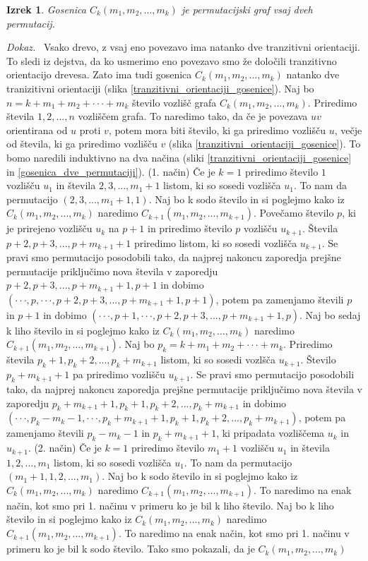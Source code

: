 \documentclass[a4paper, 12pt]{book}
\newtheorem{izrek}{Izrek}[chapter]
\newenvironment{dokaz}{\emph{Dokaz.}\ }{\hspace{\fill}{$\Box$}}
\begin{document}
\begin{izrek}
\label{izrek_gosenica_vsaj_dve_permutaciji}
    Gosenica $C_k(m_1, m_2, ..., m_k)$ je permutacijski graf vsaj dveh permutacij.
\end{izrek}
\begin{dokaz}
    Vsako drevo, z vsaj eno povezavo ima natanko dve tranzitivni orientaciji. To sledi iz dejstva, da ko usmerimo eno povezavo smo že določili tranzitivno orientacijo drevesa. Zato ima tudi gosenica $C_k(m_1, m_2, ..., m_k)$ natanko dve tranizitivni orientaciji (slika \ref{tranzitivni_orientaciji_gosenice}).
    Naj bo $n = k + m_1 + m_2 + \cdot\cdot\cdot + m_k$ število vozlišč grafa $C_k(m_1, m_2, ..., m_k)$. Priredimo števila $1, 2, ..., n$ vozliščem grafa. To naredimo tako, da če je povezava $uv$ orientirana od $u$ proti $v$, potem mora biti število, ki ga priredimo vozlišču $u$, večje od števila, ki ga priredimo vozlišču $v$ (slika \ref{tranzitivni_orientaciji_gosenice}). To bomo naredili induktivno na dva načina (sliki \ref{tranzitivni_orientaciji_gosenice} in \ref{gosenica_dve_permutaciji}). (1. način) Če je $k = 1$ priredimo število $1$ vozlišču $u_1$ in števila $2, 3, ..., m_1+1$ listom, ki so sosedi vozlišča $u_1$. To nam da permutacijo $(2, 3, ..., m_1+1, 1)$. Naj bo k sodo število in si poglejmo kako iz $C_k(m_1, m_2, ..., m_k)$ naredimo $C_{k+1}(m_1, m_2, ..., m_{k+1})$. Povečamo število $p$, ki je prirejeno vozlišču $u_k$ na $p+1$ in priredimo število $p$ vozlišču $u_{k+1}$. Števila $p+2, p+3, ..., p+m_{k+1}+1$ priredimo listom, ki so sosedi vozlišča $u_{k+1}$. Se pravi smo permutacijo posodobili tako, da najprej nakoncu zaporedja prejšne permutacije priključimo nova števila v zaporedju $p+2, p+3, ..., p+m_{k+1}+1, p+1$ in dobimo $(\cdot\cdot\cdot, p, \cdot\cdot\cdot, p+2, p+3, ..., p+m_{k+1}+1, p+1)$, potem pa zamenjamo števili $p$ in $p+1$ in dobimo $(\cdot\cdot\cdot, p+1, \cdot\cdot\cdot, p+2, p+3, ..., p+m_{k+1}+1, p)$. Naj bo sedaj k liho število in si poglejmo kako iz $C_k(m_1, m_2, ..., m_k)$ naredimo $C_{k+1}(m_1, m_2, ..., m_{k+1})$. Naj bo $p_k = k + m_1 + m_2 + \cdot\cdot\cdot + m_k$. Priredimo števila $p_k+1, p_k+2, ..., p_k+m_{k+1}$ listom, ki so sosedi vozlšča $u_{k+1}$. Število $p_k+m_{k+1}+1$ pa priredimo vozlišču $u_{k+1}$. Se pravi smo permutacijo posodobili tako, da najprej nakoncu zaporedja prejšne permutacije priključimo nova števila v zaporedju $p_k + m_{k+1} + 1, p_k+1, p_k+2,...,p_k+m_{k+1}$ in dobimo $(\cdot\cdot\cdot, p_k - m_k - 1, \cdot\cdot\cdot, p_k + m_{k+1} + 1, p_k+1, p_k+2,...,p_k+m_{k+1})$, potem pa zamenjamo števili $p_k - m_k - 1$ in $p_k + m_{k+1} + 1$, ki pripadata vozliščema $u_k$ in $u_{k+1}$. (2. način) Če je $k = 1$ priredimo število $m_1 + 1$ vozlišču $u_1$ in števila $1, 2, ..., m_1$ listom, ki so sosedi vozlišča $u_1$. To nam da permutacijo $(m_1+1, 1, 2, ..., m_1)$. Naj bo k sodo število in si poglejmo kako iz $C_k(m_1, m_2, ..., m_k)$ naredimo $C_{k+1}(m_1, m_2, ..., m_{k+1})$. To naredimo na enak način, kot smo pri 1. načinu v primeru ko je bil k liho število. Naj bo k liho število in si poglejmo kako iz $C_k(m_1, m_2, ..., m_k)$ naredimo $C_{k+1}(m_1, m_2, ..., m_{k+1})$. To naredimo na enak način, kot smo pri 1. načinu v primeru ko je bil k sodo število. Tako smo pokazali, da je $C_k(m_1, m_2, ..., m_k)$ 
\end{dokaz}
\end{document}
